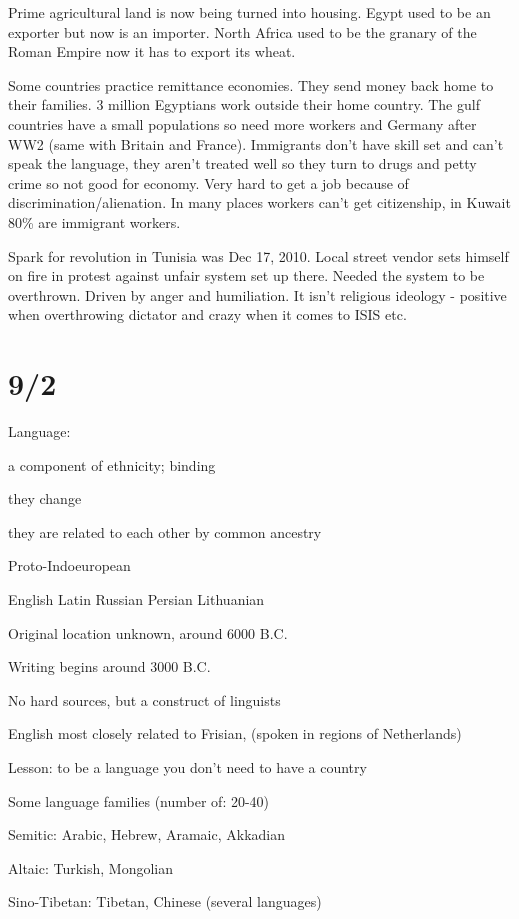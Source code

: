 \documentclass[12pt]{article}
\begin{document}
Prime agricultural land is now being turned into housing. Egypt used to be an exporter but now is an importer. North Africa used to be the granary of the Roman Empire now it has to export its wheat. 

Some countries practice remittance economies. They send money back home to their families. 3 million Egyptians work outside their home country. The gulf countries have a small populations so need more workers and Germany after WW2 (same with Britain and France). Immigrants don't have skill set and can't speak the language, they aren't treated well so they turn to drugs and petty crime so not good for economy. Very hard to get a job because of discrimination/alienation. In many places workers can't get citizenship, in Kuwait 80\% are immigrant workers. 

Spark for revolution in Tunisia was Dec 17, 2010. Local street vendor sets himself on fire in protest against unfair system set up there. Needed the system to be overthrown. Driven by anger and humiliation. It isn't religious ideology - positive when overthrowing dictator and crazy when it comes to ISIS etc. 

\newpage
\section{9/2}

Language:

a component of ethnicity; binding

they change

they are related to each other by common ancestry

\noindent
Proto-Indoeuropean

English Latin Russian Persian Lithuanian

Original location unknown, around 6000 B.C.

Writing begins around 3000 B.C.

No hard sources, but a construct of linguists

\noindent
English most closely related to Frisian, (spoken in regions of Netherlands)

Lesson: to be a language you don't need to have a country

\noindent
Some language families (number of: 20-40)

Semitic: Arabic, Hebrew, Aramaic, Akkadian

Altaic: Turkish, Mongolian

Sino-Tibetan: Tibetan, Chinese (several languages)
\end{document}
